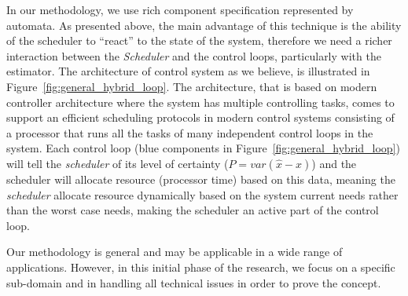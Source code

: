\documentclass[ twoside, 12pt ]{article}
\begin{document}
In our methodology, we use rich component specification represented by automata.
As presented above, the main advantage of this technique is the ability of the scheduler to ``react'' to the state of the system, therefore we need a richer interaction between the \textit{Scheduler} and the control loops, particularly with the estimator.
The architecture of control system as we believe, is illustrated in Figure~\ref{fig:general_hybrid_loop}.
The architecture, that is based on modern controller architecture where the system has multiple controlling tasks, comes to support an efficient scheduling protocols in modern control systems consisting of a processor that runs all the tasks of many independent control loops in the system. 
Each control loop (blue components in Figure~\ref{fig:general_hybrid_loop}) will tell the \textit{scheduler} of its level of certainty ($P = var(\hat{x} - x)$) and the scheduler will allocate resource (processor time) based on this data, meaning the \textit{scheduler} allocate resource dynamically based on the system current needs rather than the worst case needs, making the scheduler an active part of the control loop.

Our methodology is general and may be applicable in a wide range of applications. However, in this initial phase of the research, we focus on a specific sub-domain and in handling all technical issues in order to prove the concept.
\end{document}
